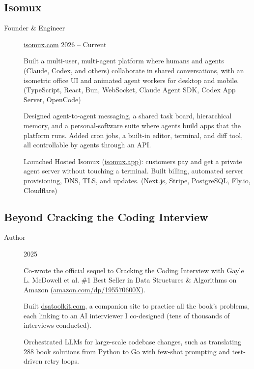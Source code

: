 \documentclass[letterpaper,10pt,oneside]{article}
\begin{document}
\subsection*{Isomux}
\vspace{-3px}
\begin{description}
	\item[Founder \& Engineer]\quad \href{https://isomux.com}{isomux.com} \hfill 2026 -- Current

	\noindent\llap{\textbullet\hspace{6pt}}Built a multi-user, multi-agent platform where humans and agents (Claude, Codex, and others) collaborate in shared conversations, with an isometric office UI and animated agent workers for desktop and mobile. (TypeScript, React, Bun, WebSocket, Claude Agent SDK, Codex App Server, OpenCode)

	\vspace{2px}
	\noindent\llap{\textbullet\hspace{6pt}}Designed agent-to-agent messaging, a shared task board, hierarchical memory, and a personal-software suite where agents build apps that the platform runs. Added cron jobs, a built-in editor, terminal, and diff tool, all controllable by agents through an API.

	\vspace{2px}
	\noindent\llap{\textbullet\hspace{6pt}}Launched Hosted Isomux (\href{https://isomux.app}{isomux.app}): customers pay and get a private agent server without touching a terminal. Built billing, automated server provisioning, DNS, TLS, and updates. (Next.js, Stripe, PostgreSQL, Fly.io, Cloudflare)
\end{description}
\subsection*{Beyond Cracking the Coding Interview}
\vspace{-3px}
\begin{description}
	\item[Author]\hfill 2025

	\noindent\llap{\textbullet\hspace{6pt}}Co-wrote the official sequel to Cracking the Coding Interview with Gayle L. McDowell et al. \#1 Best Seller in Data Structures \& Algorithms on Amazon (\href{https://www.amazon.com/dp/195570600X}{amazon.com/dp/195570600X}).

	\vspace{2px}
	\noindent\llap{\textbullet\hspace{6pt}}Built \href{https://dsatoolkit.com}{dsatoolkit.com}, a companion site to practice all the book's problems, each linking to an AI interviewer I co-designed (tens of thousands of interviews conducted).

	\vspace{2px}
	\noindent\llap{\textbullet\hspace{6pt}}Orchestrated LLMs for large-scale codebase changes, such as translating 288 book solutions from Python to Go with few-shot prompting and test-driven retry loops.

\end{description}
\end{document}
